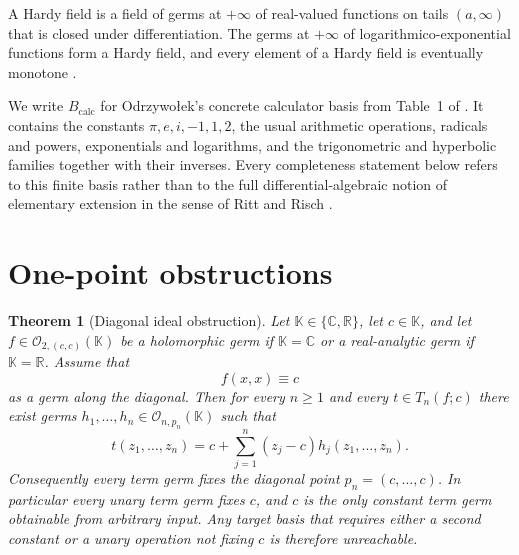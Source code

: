 \documentclass[11pt]{amsart}
\numberwithin{equation}{section}
\newtheorem{theorem}{Theorem}[section]
\theoremstyle{remark}
\theoremstyle{definition}
\newcommand{\C}{\mathbb{C}}
\newcommand{\R}{\mathbb{R}}
\newcommand{\K}{\mathbb{K}}
\newcommand{\calc}{B_{\mathrm{calc}}}
\newcommand{\Oc}{\mathcal{O}}
\begin{document}
A Hardy field is a field of germs at $+\infty$ of real-valued functions on tails $(a,\infty)$ that is closed under differentiation. The germs at $+\infty$ of logarithmico-exponential functions form a Hardy field, and every element of a Hardy field is eventually monotone \cite{Rosenlicht1983,Aschenbrenner2017}.

We write $\calc$ for Odrzywo{\l}ek's concrete calculator basis from Table~1 of \cite{Odrzywolek2026}. It contains the constants $\pi,e,i,-1,1,2$, the usual arithmetic operations, radicals and powers, exponentials and logarithms, and the trigonometric and hyperbolic families together with their inverses. Every completeness statement below refers to this finite basis rather than to the full differential-algebraic notion of elementary extension in the sense of Ritt and Risch \cite{Ritt1948,Risch1969}.

\section{One-point obstructions}\label{sec:obstructions}

\begin{theorem}[Diagonal ideal obstruction]\label{thm:diag-ideal}
Let $\K\in\{\C,\R\}$, let $c\in\K$, and let $f\in \Oc_{2,(c,c)}(\K)$ be a holomorphic germ if $\K=\C$ or a real-analytic germ if $\K=\R$. Assume that
\[
f(x,x)\equiv c
\]
as a germ along the diagonal. Then for every $n\geq 1$ and every $t\in T_n(f;c)$ there exist germs $h_1,\dots,h_n\in \Oc_{n,p_n}(\K)$ such that
\begin{equation}\label{eq:diag-ideal-form}
t(z_1,\dots,z_n)=c+\sum_{j=1}^n (z_j-c)h_j(z_1,\dots,z_n).
\end{equation}
Consequently every term germ fixes the diagonal point $p_n=(c,\dots,c)$. In particular every unary term germ fixes $c$, and $c$ is the only constant term germ obtainable from arbitrary input. Any target basis that requires either a second constant or a unary operation not fixing $c$ is therefore unreachable.
\end{theorem}
\end{document}
